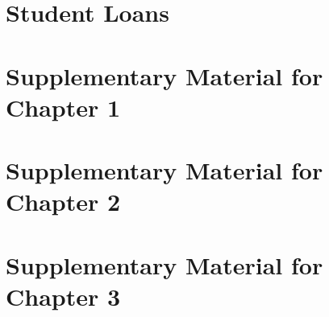 \documentclass[12pt,letterpaper,oneside,final]{memoir}
\begin{document}
  
  
  
  
  


\chapter{Student Loans}

  
  
  
  
  
  

\newpage
\clearpage

\begin{appendices}

\appendix
{}

\chapter{Supplementary Material for Chapter 1} \label{sec:Appendix1}

  
  

\chapter{Supplementary Material for Chapter 2} \label{sec:Appendix2}

  
  

\newpage
\clearpage

\chapter{Supplementary Material for Chapter 3} \label{sec:Appendix3}

  
  

\end{appendices}

\newpage

\clearpage

\backmatter


  \begin{OnehalfSpace}
    
    
  \end{OnehalfSpace}
\end{document}
